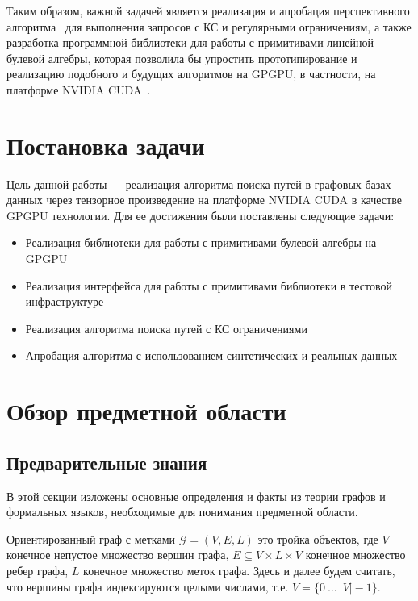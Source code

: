 \documentclass[14pt]{matmex-diploma-custom}
\begin{document}
Таким образом, важной задачей является реализация и апробация перспективного алгоритма~\cite{inbook:kronecker_cfpq_adbis} для выполнения запросов с КС и регулярными ограничениям, а также разработка программной библиотеки для работы с примитивами линейной булевой алгебры, которая позволила бы упростить прототипирование и реализацию подобного и будущих алгоритмов на GPGPU, в частности, на платформе NVIDIA CUDA~\cite{net:cuda_toolkit_docs}.

\section{Постановка задачи}

Цель данной работы --- реализация алгоритма поиска путей в графовых базах данных через тензорное произведение на платформе NVIDIA CUDA в качестве GPGPU технологии. Для ее достижения были поставлены следующие задачи:

\begin{itemize}
    \item Реализация библиотеки для работы с примитивами булевой алгебры на GPGPU
    \item Реализация интерфейса для работы с примитивами библиотеки в тестовой инфраструктуре
    \item Реализация алгоритма поиска путей с КС ограничениями
    \item Апробация алгоритма с использованием синтетических и реальных данных
\end{itemize}

\section{Обзор предметной области}

\subsection{Предварительные знания}

В этой секции изложены основные определения и факты из теории графов и формальных языков, необходимые для понимания предметной области. 
    
Ориентированный граф с метками $\mathcal{G} = (V, E, L)$ это тройка объектов, где $V$ конечное непустое множество вершин графа, $E \subseteq V \times L \times V$ конечное множество ребер графа, $L$ конечное множество меток графа. Здесь и далее будем считать, что вершины графа индексируются целыми числами, т.е. $V = \{0~...~|V| - 1\}$.
\end{document}
